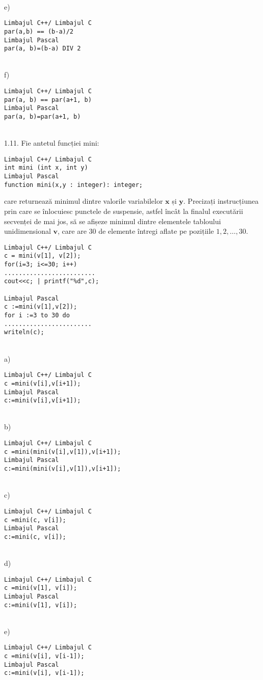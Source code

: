 \\
e) \begin{verbatim}
Limbajul C++/ Limbajul C
par(a,b) == (b-a)/2
Limbajul Pascal
par(a, b)=(b-a) DIV 2
\end{verbatim}
\\
f) \begin{verbatim}
Limbajul C++/ Limbajul C
par(a, b) == par(a+1, b)
Limbajul Pascal
par(a, b)=par(a+1, b)
\end{verbatim}
\\
1.11. Fie antetul funcției mini:
\begin{verbatim}
Limbajul C++/ Limbajul C
int mini (int x, int y)
Limbajul Pascal
function mini(x,y : integer): integer;
\end{verbatim}
care returnează minimul dintre valorile variabilelor $\mathbf{x}$ și $\mathbf{y}$. Precizați instrucțiunea prin care se înlocuiesc punctele de suspensie, astfel încât la finalul executării secvenței de mai jos, să se afișeze minimul dintre elementele tabloului unidimensional $\mathbf{v}$, care are 30 de elemente întregi aflate pe pozițiile $1,2, \ldots, 30$.
\begin{verbatim}
Limbajul C++/ Limbajul C
c = mini(v[1], v[2]);
for(i=3; i<=30; i++)
.........................
cout<<c; | printf("%d",c);

Limbajul Pascal
c :=mini(v[1],v[2]);
for i :=3 to 30 do
........................
writeln(c);
\end{verbatim}
\\
a) \begin{verbatim}
Limbajul C++/ Limbajul C
c =mini(v[i],v[i+1]);
Limbajul Pascal
c:=mini(v[i],v[i+1]);
\end{verbatim}
\\
b) \begin{verbatim}
Limbajul C++/ Limbajul C
c =mini(mini(v[i],v[1]),v[i+1]);
Limbajul Pascal
c:=mini(mini(v[i],v[1]),v[i+1]);
\end{verbatim}
\\
c) \begin{verbatim}
Limbajul C++/ Limbajul C
c =mini(c, v[i]);
Limbajul Pascal
c:=mini(c, v[i]);
\end{verbatim}
\\
d) \begin{verbatim}
Limbajul C++/ Limbajul C
c =mini(v[1], v[i]);
Limbajul Pascal
c:=mini(v[1], v[i]);
\end{verbatim}
\\
e) \begin{verbatim}
Limbajul C++/ Limbajul C
c =mini(v[i], v[i-1]);
Limbajul Pascal
c:=mini(v[i], v[i-1]);
\end{verbatim}
